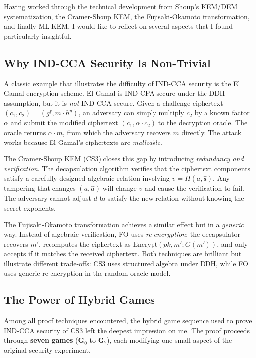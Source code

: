 Having worked through the technical development from Shoup's KEM/DEM systematization, the Cramer-Shoup KEM, the Fujisaki-Okamoto transformation, and finally ML-KEM, I would like to reflect on several aspects that I found particularly insightful.

\subsection{Why IND-CCA Security Is Non-Trivial}

A classic example that illustrates the difficulty of IND-CCA security is the El Gamal encryption scheme. El Gamal is IND-CPA secure under the DDH assumption, but it is \textit{not} IND-CCA secure. Given a challenge ciphertext $(c_1, c_2) = (g^y, m \cdot h^y)$, an adversary can simply multiply $c_2$ by a known factor $\alpha$ and submit the modified ciphertext $(c_1, \alpha \cdot c_2)$ to the decryption oracle. The oracle returns $\alpha \cdot m$, from which the adversary recovers $m$ directly. The attack works because El Gamal's ciphertexts are \textit{malleable}.

The Cramer-Shoup KEM (CS3) closes this gap by introducing \textit{redundancy and verification}. The decapsulation algorithm verifies that the ciphertext components satisfy a carefully designed algebraic relation involving $v = H(a, \hat{a})$. Any tampering that changes $(a, \hat{a})$ will change $v$ and cause the verification to fail. The adversary cannot adjust $d$ to satisfy the new relation without knowing the secret exponents.

The Fujisaki-Okamoto transformation achieves a similar effect but in a \textit{generic} way. Instead of algebraic verification, FO uses \textit{re-encryption}: the decapsulator recovers $m'$, recomputes the ciphertext as $\text{Encrypt}(pk, m'; G(m'))$, and only accepts if it matches the received ciphertext. Both techniques are brilliant but illustrate different trade-offs: CS3 uses structured algebra under DDH, while FO uses generic re-encryption in the random oracle model.

\subsection{The Power of Hybrid Games}

Among all proof techniques encountered, the hybrid game sequence used to prove IND-CCA security of CS3 left the deepest impression on me. The proof proceeds through \textbf{seven games} ($\mathbf{G}_0$ to $\mathbf{G}_7$), each modifying one small aspect of the original security experiment.

